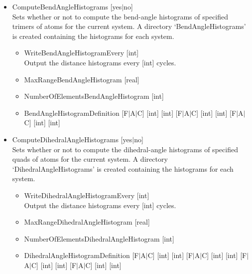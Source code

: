 \begin{itemize}
\item{ComputeBendAngleHistograms [yes$|$no]}\\
Sets whether or not to compute the bend-angle histograms of specified trimers of atoms for the current system.
A directory `BendAngleHistograms' is created containing the histograms for each system.
\begin{itemize}
\item{WriteBendAngleHistogramEvery [int]}\\
Output the distance histograms every [int] cycles.
\item{MaxRangeBendAngleHistogram [real]}\\
\item{NumberOfElementsBendAngleHistogram [int]}\\
\item{BendAngleHistogramDefinition [F$|$A$|$C] [int] [int] [F$|$A$|$C] [int] [int] [F$|$A$|$C] [int] [int]}\\
\end{itemize}

\item{ComputeDihedralAngleHistograms [yes$|$no]}\\
Sets whether or not to compute the dihedral-angle histograms of specified quads of atoms for the current system.
A directory `DihedralAngleHistograms' is created containing the histograms for each system.
\begin{itemize}
\item{WriteDihedralAngleHistogramEvery [int]}\\
Output the distance histograms every [int] cycles.
\item{MaxRangeDihedralAngleHistogram [real]}\\
\item{NumberOfElementsDihedralAngleHistogram [int]}\\
\item{DihedralAngleHistogramDefinition \small{[F$|$A$|$C] [int] [int] [F$|$A$|$C] [int] [int] [F$|$A$|$C] [int] [int] [F$|$A$|$C] [int] [int]}}\\
\end{itemize}


\end{itemize}
